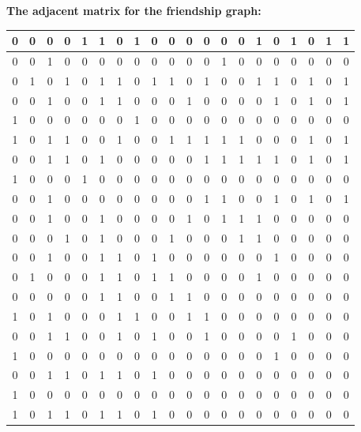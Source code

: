 \documentclass{article}
\begin{document}
  \begin{table}[H]
    \centering
    \textbf{The adjacent matrix for the friendship graph:}\\
    \begin{tabular}{|c|c|c|c|c|c|c|c|c|c|c|c|c|c|c|c|c|c|c|c|}
      \hline
      0 & 0 & 0 & 0 & 1 & 1 & 0 & 1 & 0 & 0 & 0 & 0 & 0 & 0 & 1 & 0 & 1 & 0 & 1 & 1 \\ \hline
      0 & 0 & 1 & 0 & 0 & 0 & 0 & 0 & 0 & 0 & 0 & 0 & 1 & 0 & 0 & 0 & 0 & 0 & 0 & 0 \\ \hline
      0 & 1 & 0 & 1 & 0 & 1 & 1 & 0 & 1 & 1 & 0 & 1 & 0 & 0 & 1 & 1 & 0 & 1 & 0 & 1 \\ \hline
      0 & 0 & 1 & 0 & 0 & 1 & 1 & 0 & 0 & 0 & 1 & 0 & 0 & 0 & 0 & 1 & 0 & 1 & 0 & 1 \\ \hline
      1 & 0 & 0 & 0 & 0 & 0 & 0 & 1 & 0 & 0 & 0 & 0 & 0 & 0 & 0 & 0 & 0 & 0 & 0 & 0 \\ \hline
      1 & 0 & 1 & 1 & 0 & 0 & 1 & 0 & 0 & 1 & 1 & 1 & 1 & 1 & 0 & 0 & 0 & 1 & 0 & 1 \\ \hline
      0 & 0 & 1 & 1 & 0 & 1 & 0 & 0 & 0 & 0 & 0 & 1 & 1 & 1 & 1 & 1 & 0 & 1 & 0 & 1 \\ \hline
      1 & 0 & 0 & 0 & 1 & 0 & 0 & 0 & 0 & 0 & 0 & 0 & 0 & 0 & 0 & 0 & 0 & 0 & 0 & 0 \\ \hline
      0 & 0 & 1 & 0 & 0 & 0 & 0 & 0 & 0 & 0 & 0 & 1 & 1 & 0 & 0 & 1 & 0 & 1 & 0 & 1 \\ \hline
      0 & 0 & 1 & 0 & 0 & 1 & 0 & 0 & 0 & 0 & 1 & 0 & 1 & 1 & 1 & 0 & 0 & 0 & 0 & 0 \\ \hline
      0 & 0 & 0 & 1 & 0 & 1 & 0 & 0 & 0 & 1 & 0 & 0 & 0 & 1 & 1 & 0 & 0 & 0 & 0 & 0 \\ \hline
      0 & 0 & 1 & 0 & 0 & 1 & 1 & 0 & 1 & 0 & 0 & 0 & 0 & 0 & 0 & 1 & 0 & 0 & 0 & 0 \\ \hline
      0 & 1 & 0 & 0 & 0 & 1 & 1 & 0 & 1 & 1 & 0 & 0 & 0 & 0 & 1 & 0 & 0 & 0 & 0 & 0 \\ \hline
      0 & 0 & 0 & 0 & 0 & 1 & 1 & 0 & 0 & 1 & 1 & 0 & 0 & 0 & 0 & 0 & 0 & 0 & 0 & 0 \\ \hline
      1 & 0 & 1 & 0 & 0 & 0 & 1 & 1 & 0 & 0 & 1 & 1 & 0 & 0 & 0 & 0 & 0 & 0 & 0 & 0 \\ \hline
      0 & 0 & 1 & 1 & 0 & 0 & 1 & 0 & 1 & 0 & 0 & 1 & 0 & 0 & 0 & 0 & 1 & 0 & 0 & 0 \\ \hline
      1 & 0 & 0 & 0 & 0 & 0 & 0 & 0 & 0 & 0 & 0 & 0 & 0 & 0 & 0 & 1 & 0 & 0 & 0 & 0 \\ \hline
      0 & 0 & 1 & 1 & 0 & 1 & 1 & 0 & 1 & 0 & 0 & 0 & 0 & 0 & 0 & 0 & 0 & 0 & 0 & 0 \\ \hline
      1 & 0 & 0 & 0 & 0 & 0 & 0 & 0 & 0 & 0 & 0 & 0 & 0 & 0 & 0 & 0 & 0 & 0 & 0 & 0 \\ \hline
      1 & 0 & 1 & 1 & 0 & 1 & 1 & 0 & 1 & 0 & 0 & 0 & 0 & 0 & 0 & 0 & 0 & 0 & 0 & 0 \\ \hline
    \end{tabular}
  \end{table}
\end{document}
